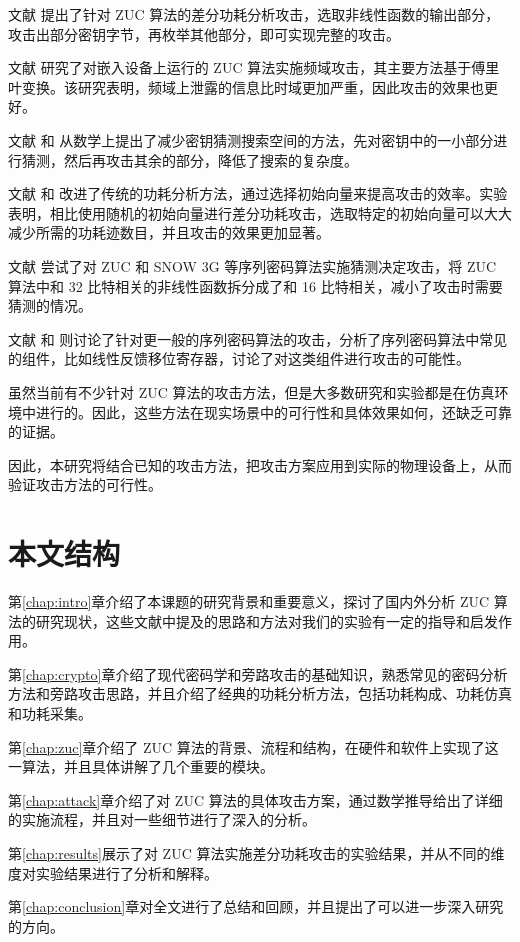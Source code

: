 文献 \parencite{zuc_attack_tangming} 提出了针对 ZUC 算法的差分功耗分析攻击，选取非线性函数的输出部分，攻击出部分密钥字节，再枚举其他部分，即可实现完整的攻击。

文献 \parencite{zuc_freq} 研究了对嵌入设备上运行的 ZUC 算法实施频域攻击，其主要方法基于傅里叶变换。该研究表明，频域上泄露的信息比时域更加严重，因此攻击的效果也更好。

文献 \parencite{zuc_security} 和 \parencite{zuc_analyical} 从数学上提出了减少密钥猜测搜索空间的方法，先对密钥中的一小部分进行猜测，然后再攻击其余的部分，降低了搜索的复杂度。

文献 \parencite{zuc_iv} 和 \parencite{zuc_wu}改进了传统的功耗分析方法，通过选择初始向量来提高攻击的效率。实验表明，相比使用随机的初始向量进行差分功耗攻击，选取特定的初始向量可以大大减少所需的功耗迹数目，并且攻击的效果更加显著。

文献 \parencite{zuc_guess} 尝试了对 ZUC 和 SNOW 3G 等序列密码算法实施猜测决定攻击，将 ZUC 算法中和 32 比特相关的非线性函数拆分成了和 16 比特相关，减小了攻击时需要猜测的情况。

文献 \parencite{stream_fischer} 和 \parencite{stream_gu} 则讨论了针对更一般的序列密码算法的攻击，分析了序列密码算法中常见的组件，比如线性反馈移位寄存器，讨论了对这类组件进行攻击的可能性。

\vspace*{0.5\baselineskip}

虽然当前有不少针对 ZUC 算法的攻击方法，但是大多数研究和实验都是在仿真环境中进行的。因此，这些方法在现实场景中的可行性和具体效果如何，还缺乏可靠的证据。

因此，本研究将结合已知的攻击方法，把攻击方案应用到实际的物理设备上，从而验证攻击方法的可行性。

\section{本文结构}

第\ref{chap:intro}章介绍了本课题的研究背景和重要意义，探讨了国内外分析 ZUC 算法的研究现状，这些文献中提及的思路和方法对我们的实验有一定的指导和启发作用。

第\ref{chap:crypto}章介绍了现代密码学和旁路攻击的基础知识，熟悉常见的密码分析方法和旁路攻击思路，并且介绍了经典的功耗分析方法，包括功耗构成、功耗仿真和功耗采集。

第\ref{chap:zuc}章介绍了 ZUC 算法的背景、流程和结构，在硬件和软件上实现了这一算法，并且具体讲解了几个重要的模块。

第\ref{chap:attack}章介绍了对 ZUC 算法的具体攻击方案，通过数学推导给出了详细的实施流程，并且对一些细节进行了深入的分析。

第\ref{chap:results}展示了对 ZUC 算法实施差分功耗攻击的实验结果，并从不同的维度对实验结果进行了分析和解释。

第\ref{chap:conclusion}章对全文进行了总结和回顾，并且提出了可以进一步深入研究的方向。

